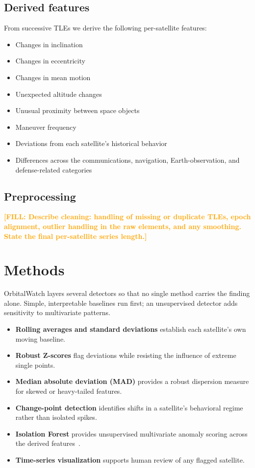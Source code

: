 \documentclass[11pt]{article}
\newcommand{\fill}[1]{\textcolor{orange}{\textbf{[FILL: #1]}}}
\begin{document}
\subsection{Derived features}
From successive TLEs we derive the following per-satellite features:
\begin{itemize}[leftmargin=*]
  \item Changes in inclination
  \item Changes in eccentricity
  \item Changes in mean motion
  \item Unexpected altitude changes
  \item Unusual proximity between space objects
  \item Maneuver frequency
  \item Deviations from each satellite's historical behavior
  \item Differences across the communications, navigation, Earth-observation,
        and defense-related categories
\end{itemize}

\subsection{Preprocessing}
\fill{Describe cleaning: handling of missing or duplicate TLEs, epoch alignment,
outlier handling in the raw elements, and any smoothing. State the final
per-satellite series length.}

\section{Methods}
\label{sec:methods}

OrbitalWatch layers several detectors so that no single method carries the
finding alone. Simple, interpretable baselines run first; an unsupervised
detector adds sensitivity to multivariate patterns.

\begin{itemize}[leftmargin=*]
  \item \textbf{Rolling averages and standard deviations} establish each
        satellite's own moving baseline.
  \item \textbf{Robust Z-scores} flag deviations while resisting the influence
        of extreme single points.
  \item \textbf{Median absolute deviation (MAD)} provides a robust dispersion
        measure for skewed or heavy-tailed features.
  \item \textbf{Change-point detection} identifies shifts in a satellite's
        behavioral regime rather than isolated spikes.
  \item \textbf{Isolation Forest} provides unsupervised multivariate anomaly
        scoring across the derived features~\cite{iforest}.
  \item \textbf{Time-series visualization} supports human review of any flagged
        satellite.
\end{itemize}
\end{document}
